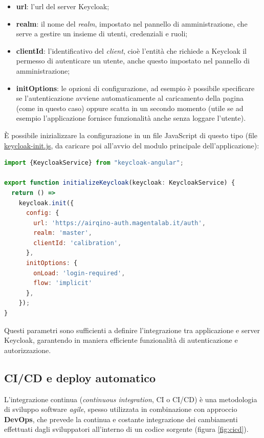 \begin{itemize}
  \item \textbf{url}: l'url del server Keycloak;
  \item \textbf{realm}: il nome del \textit{realm}, impostato nel pannello di amministrazione, che serve a gestire un insieme di utenti, credenziali e ruoli;
  \item \textbf{clientId}: l'identificativo del \textit{client}, cioè l'entità che richiede a Keycloak il permesso di autenticare un utente, anche questo impostato nel pannello di amministrazione;
  \item \textbf{initOptions}: le opzioni di configurazione, ad esempio è possibile specificare se l'autenticazione avviene automaticamente al caricamento della pagina (come in questo caso) oppure scatta in un secondo momento (utile se ad esempio l'applicazione fornisce funzionalità anche senza loggare l'utente).
\end{itemize}

È possibile inizializzare la configurazione in un file JavaScript di questo tipo (file \url{keycloak-init.js}, da caricare poi all'avvio del modulo principale dell'applicazione):

\vspace{1mm}
\begin{lstlisting}[language=js]
import {KeycloakService} from "keycloak-angular";

export function initializeKeycloak(keycloak: KeycloakService) {
  return () =>
    keycloak.init({
      config: {
        url: 'https://airqino-auth.magentalab.it/auth',
        realm: 'master',
        clientId: 'calibration',
      },
      initOptions: {
        onLoad: 'login-required',
        flow: 'implicit'
      },
    });
}
\end{lstlisting}

Questi parametri sono sufficienti a definire l'integrazione tra applicazione e server Keycloak, garantendo in maniera efficiente funzionalità di autenticazione e autorizzazione.

\subsection{CI/CD e deploy automatico}\label{sec:ci}
L'integrazione continua (\textit{continuous integration}, CI o CI/CD) è una metodologia di sviluppo software \textit{agile}, spesso utilizzata in combinazione con approccio \textbf{DevOps}, che prevede la continua e costante integrazione dei cambiamenti effettuati dagli sviluppatori all'interno di un codice sorgente (figura \ref{fig:cicd}).

